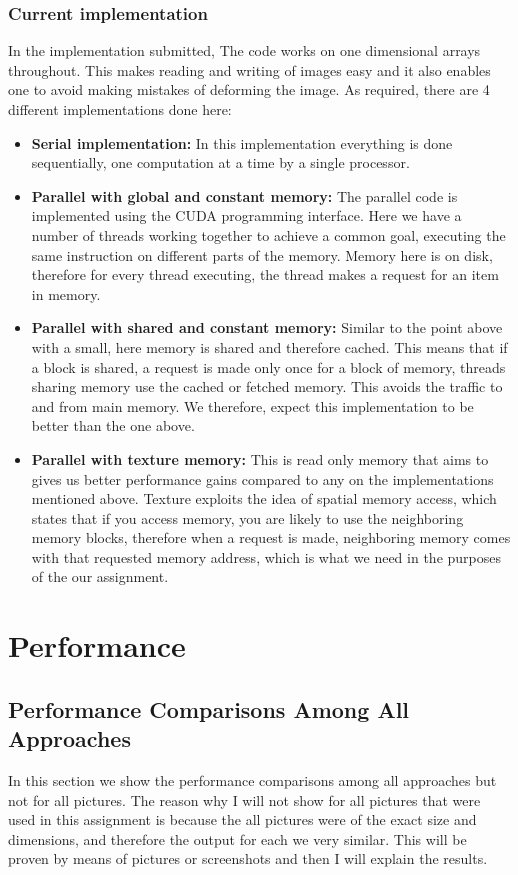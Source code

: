  \subsubsection*{Current implementation}
 In the implementation submitted, The code works on one dimensional arrays throughout. This makes reading and writing of images easy and it also enables one to avoid making mistakes of deforming the image. As required, there are 4 different implementations done here:
 \begin{itemize}
 	\item \textbf{Serial implementation:} In this implementation everything is done sequentially, one computation at a time by a single processor.
 	\item \textbf{Parallel with global and constant memory:} The parallel code is implemented using the CUDA programming interface. Here we have a number of threads working together to achieve a common goal, executing the same instruction on different parts of the memory. Memory here is on disk, therefore for every thread executing, the thread makes a request for an item in memory.
 	\item \textbf{Parallel with shared and constant memory:}  Similar to the point above with a small, here memory is shared and therefore cached. This means that if a block is shared, a request is made only once for a block of memory, threads sharing memory use the cached or fetched memory. This avoids the traffic to and from main memory. We therefore, expect this implementation to be better than the one above.
 	\item \textbf{Parallel with texture memory:} This is read only memory that aims to gives us better performance gains compared to any on the implementations mentioned above. Texture exploits the idea of spatial memory access, which states that if you access memory, you are likely to use the neighboring memory blocks, therefore when a request is made, neighboring memory comes with that requested memory address, which is what we need in the purposes of the our assignment.
 \end{itemize}

\section*{Performance}
\subsection*{Performance Comparisons Among All Approaches}
In this section we show the performance comparisons among all approaches but not for all pictures. The reason why I will not show for all pictures that were used in this assignment is because the all pictures were of the exact size and dimensions, and therefore the output for each we very similar. This will be proven by means of pictures or screenshots and then I will explain the results.

